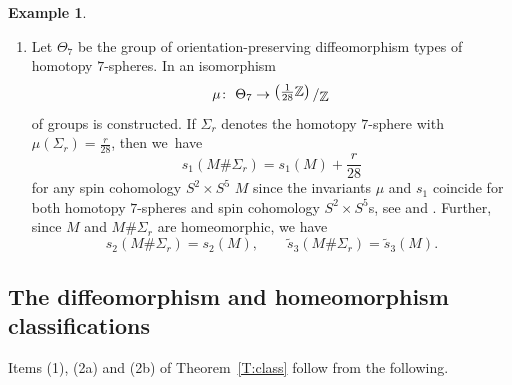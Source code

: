 \documentclass[pdftex]{sigma}
\numberwithin{equation}{section}
\theoremstyle{definition}
\newtheorem{Example}[Theorem]{Example}
\numberwithin{table}{section}
\newcommand{\Z}{\mathbb{Z}}
\newcommand{\bigslant}[2]{{\raisebox{.2em}{$#1$}\left/\raisebox{-.2em}{$#2$}\right.}}
\newcommand{\ttimes}{\mathrel{\widetilde{\times} }}
\begin{document}
\begin{Example}
\begin{enumerate}
		This shows that $\mathrm{SU}(3)/S^1$ is either diffeomorphic to $S^2\times S^5$ or to $S^5\ttimes S^2$. By \cite[Lemma~4.4]{KS91},\footnote{Note that there is a typo in the formula for $s_3$ in \cite[Lemma~4.4]{KS91}. The correct expression is given by ${s_3(N_{k,l})=\frac{-4P+NS}{6N}}$.} its $s$-invariants are given as follows:
		\[
         s_1\bigl(\mathrm{SU}(3)/S^1\bigr)=s_2\bigl(\mathrm{SU}(3)/S^1\bigr)=0,\qquad \tilde{s}_3\bigl(\mathrm{SU}(3)/S^1\bigr)=\frac{1}{2}.
         \]
		Hence, $\mathrm{SU}(3)/S^1$ is not diffeomorphic to $S^2\times S^5$ and consequently it is diffeomorphic to~\smash{${S^5\ttimes S^2}$}. In particular,
		\[
         s_1\bigl(S^5\ttimes S^2\bigr)=s_2\bigl(S^5\ttimes S^2\bigr)=0,\qquad \tilde{s}_3\bigl(S^5\ttimes S^2\bigr)=\frac{1}{2}.
         \]
		\item[$(3)$] Let $\Theta_7$ be the group of orientation-preserving diffeomorphism types of homotopy $7$-spheres. In \cite{EK62} an isomorphism
		\[
        \mu\colon\ \Theta_7\to\bigslant{\left(\frac{1}{28}\Z\right)}{\Z}
        \]
		of groups is constructed. If $\Sigma_r$ denotes the homotopy $7$-sphere with $\mu(\Sigma_r)=\frac{r}{28}$, then we~have
		\[
         s_1(M\#\Sigma_r)=s_1(M)+\frac{r}{28}
         \]
		for any spin cohomology $S^2\times S^5$ $M$ since the invariants $\mu$ and $s_1$ coincide for both homotopy $7$-spheres and spin cohomology $S^2\times S^5$s, see \cite[Section 3]{KS88} and \cite[Lemma~4]{Xu25}. Further, since $M$ and $M\#\Sigma_r$ are homeomorphic, we have
		\[
         s_2(M\#\Sigma_r)=s_2(M),\qquad \tilde{s}_3(M\#\Sigma_r)=\tilde{s}_3(M).
         \]
	\end{enumerate}
\end{Example}

\subsection{The diffeomorphism and homeomorphism classifications}

Items (1), (2a) and (2b) of Theorem~\ref{T:class} follow from the following.
\end{document}
